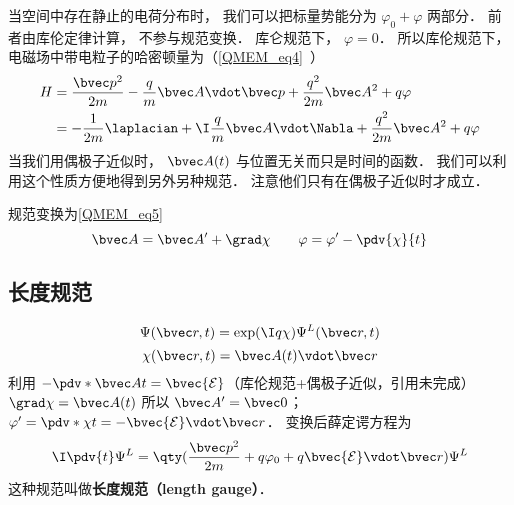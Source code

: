 
\begin{issues}
\issueDraft
\end{issues}


当空间中存在静止的电荷分布时， 我们可以把标量势能分为 $\varphi_0 + \varphi$ 两部分． 前者由库伦定律计算， 不参与规范变换． 库仑规范下， $\varphi = 0$． 所以库伦规范下， 电磁场中带电粒子的哈密顿量为（\autoref{QMEM_eq4}~）
\begin{equation}
\begin{aligned}
H &= \frac{\bvec p^2}{2m} - \frac{q}{m} \bvec A \vdot \bvec p + \frac{q^2}{2m} \bvec A^2 + q\varphi\\
&= -\frac{1}{2m} \laplacian + \I \frac{q}{m} \bvec A \vdot \Nabla + \frac{q^2}{2m} \bvec A^2 + q\varphi
\end{aligned}
\end{equation}
当我们用偶极子近似时， $\bvec A(t)$ 与位置无关而只是时间的函数． 我们可以利用这个性质方便地得到另外另种规范． 注意他们只有在偶极子近似时才成立．

 规范变换为\autoref{QMEM_eq5}~
\begin{equation}\label{LVgaug_eq1}
\bvec A = \bvec A' + \grad \chi
\qquad
\varphi = \varphi' - \pdv{\chi}{t}
\end{equation}

\subsection{长度规范}

\begin{equation}
\Psi(\bvec r, t) = \exp(\I q\chi)\Psi^L(\bvec r, t)
\end{equation}
\begin{equation}
\chi(\bvec r, t) = \bvec A(t) \vdot \bvec r
\end{equation}
利用 $-\pdv*{\bvec A}{t} = \bvec {\mathcal E}$（库伦规范+偶极子近似，引用未完成） $\grad \chi = \bvec A(t)$ 所以 $\bvec A' = \bvec 0$； $\varphi' = \pdv*{\chi}{t} = -\bvec {\mathcal E} \vdot \bvec r$． 变换后薛定谔方程为
\begin{equation}
\I \pdv{t} \Psi^L = \qty(\frac{\bvec p^2}{2m} + q\varphi_0 + q\bvec{\mathcal{E}} \vdot \bvec r) \Psi^L
\end{equation}
这种规范叫做\textbf{长度规范（length gauge）}．

